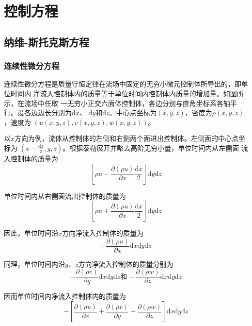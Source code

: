 \chapter{控制方程}
\section{纳维-斯托克斯方程}
\subsection{连续性微分方程}
连续性微分方程是质量守恒定律在流场中固定的无穷小微元控制体所导出的，即单位时间内
净流入控制体内的质量等于单位时间内控制体内质量的增加量。如图所示，在流场中任取
一无穷小正交六面体控制体，各边分别与直角坐标系各轴平行。设各边边长分别为$\mathrm{d}x$、
$\mathrm{d}y$和$\mathrm{d}z$。中心点坐标为$(x,y,z)$，密度为$\rho(x,y,z)$，速度为
$(u(x,y,z), v(x,y,z), w(x,y,z))$。

以$x$方向为例，流体从控制体的左侧和右侧两个面进出控制体。左侧面的中心点坐标为
$(x-\frac{\mathrm{d}x}{2},y,z)$。根据泰勒展开并略去高阶无穷小量，单位时间内从左侧面
流入控制体的质量为
\begin{equation*}
\left[\rho u-\frac{\partial (\rho u)}{\partial x}\frac {\mathrm{d}x}{2}\right]\mathrm{d}y\mathrm{d}z
\end{equation*}

单位时间内从右侧面流出控制体的质量为
\begin{equation*}
\left[\rho u+\frac{\partial (\rho u)}{\partial x}\frac {\mathrm{d}x}{2}\right]\mathrm{d}y\mathrm{d}z
\end{equation*}

因此，单位时间沿$x$方向净流入控制体的质量为
\begin{equation}
-\frac{\partial (\rho u)}{\partial x}\mathrm{d}x\mathrm{d}y\mathrm{d}z
\end{equation}

同理，单位时间内沿$y$、$z$方向净流入控制体的质量分别为
\begin{equation*}
-\frac{\partial (\rho v)}{\partial y}\mathrm{d}x\mathrm{d}y\mathrm{d}z
\mbox{和}
-\frac{\partial (\rho w)}{\partial z}\mathrm{d}x\mathrm{d}y\mathrm{d}z
\end{equation*}

因而单位时间内净流入控制体内的质量为
\begin{equation}
-
\left[
  \frac {\partial (\rho u)} {\partial x}
  +
  \frac {\partial (\rho v)} {\partial y}
  +
  \frac {\partial (\rho w)} {\partial z}
\right]
\mathrm{d}x\mathrm{d}y\mathrm{d}z
\end{equation}

